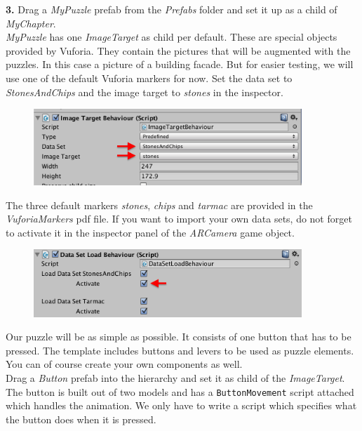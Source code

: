 \documentclass[a4paper]{article}
\begin{document}
\textbf{3.}  Drag a \textit{MyPuzzle} prefab from the \textit{Prefabs} folder and set it up as a child of \textit{MyChapter}.\\

\textit{MyPuzzle} has one \textit{ImageTarget} as child per default. These are special objects provided by Vuforia. They contain the pictures that will be augmented with the puzzles. In this case a picture of a building facade. But for easier testing, we will use one of the default Vuforia markers for now. Set the data set to \textit{StonesAndChips} and the image target to \textit{stones} in the inspector.

\begin{figure}[H]
\centering
\includegraphics[width=0.9\textwidth]{figures/3-1.png}
\end{figure}

The three default markers \textit{stones}, \textit{chips} and \textit{tarmac} are provided in the \textit{VuforiaMarkers} pdf file. If you want to import your own data sets, do not forget to activate it in the inspector panel of the \textit{ARCamera} game object.\\

\begin{figure}[H]
\centering
\includegraphics[width=0.9\textwidth]{figures/3-2.png}
\end{figure}

Our puzzle will be as simple as possible. It consists of one button that has to be pressed. The template includes buttons and levers to be used as puzzle elements. You can of course create your own components as well.\\

Drag a \textit{Button} prefab into the hierarchy and set it as child of the \textit{ImageTarget}. The button is built out of two models and has a \texttt{ButtonMovement} script attached which handles the animation. We only have to write a script which specifies what the button does when it is pressed.\\
\end{document}

